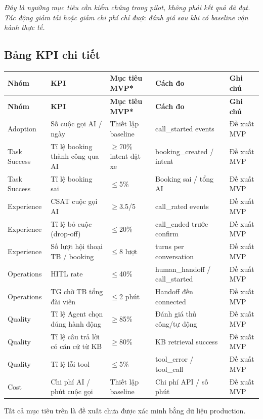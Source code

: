 \documentclass[12pt,a4paper]{article}
\begin{document}
\textit{Đây là ngưỡng mục tiêu cần kiểm chứng trong pilot, không phải kết quả đã đạt. Tác động giảm tải hoặc giảm chi phí chỉ được đánh giá sau khi có baseline vận hành thực tế.}

\subsection{Bảng KPI chi tiết}

\begin{longtable}{L{2cm} L{3.5cm} L{2.5cm} L{3cm} L{3cm}}
  \toprule
  \textbf{Nhóm}&\textbf{KPI}&\textbf{Mục tiêu MVP*}&\textbf{Cách đo}&\textbf{Ghi chú}\\
  \midrule\endfirsthead\toprule{}\textbf{Nhóm}&\textbf{KPI}&\textbf{Mục tiêu MVP*}&\textbf{Cách đo}&\textbf{Ghi chú}\\\midrule\endhead\bottomrule\endlastfoot
  Adoption & Số cuộc gọi AI / ngày & Thiết lập baseline & call\_started events & Đề xuất MVP \\
  Task Success & Tỉ lệ booking thành công qua AI & $\geq$70\% intent đặt xe & booking\_created / intent & Đề xuất MVP \\
  Task Success & Tỉ lệ booking sai & $\leq$5\% & Booking sai / tổng AI & Đề xuất MVP \\
  Experience & CSAT cuộc gọi AI & $\geq$3.5/5 & call\_rated events & Đề xuất MVP \\
  Experience & Tỉ lệ bỏ cuộc (drop-off) & $\leq$20\% & call\_ended trước confirm & Đề xuất MVP \\
  Experience & Số lượt hội thoại TB / booking & $\leq$8 lượt & turns per conversation & Đề xuất MVP \\
  Operations & HITL rate & $\leq$40\% & human\_handoff / call\_started & Đề xuất MVP \\
  Operations & TG chờ TB tổng đài viên & $\leq$2 phút & Handoff đến connected & Đề xuất MVP \\
  Quality & Tỉ lệ Agent chọn đúng hành động & $\geq$85\% & Đánh giá thủ công/tự động & Đề xuất MVP \\
  Quality & Tỉ lệ câu trả lời có căn cứ từ KB & $\geq$80\% & KB retrieval success & Đề xuất MVP \\
  Quality & Tỉ lệ lỗi tool & $\leq$5\% & tool\_error / tool\_call & Đề xuất MVP \\
  Cost & Chi phí AI / phút cuộc gọi & Thiết lập baseline & Chi phí API / số phút & Đề xuất MVP \\
\end{longtable}
{\small * Tất cả mục tiêu trên là đề xuất chưa được xác minh bằng dữ liệu production.}
\end{document}
